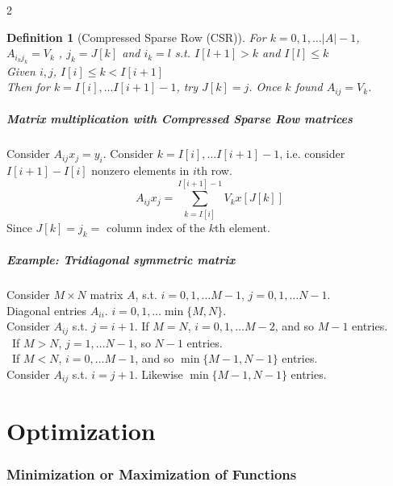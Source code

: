 \documentclass[10pt]{amsart}
\newtheorem{definition}{Definition}
\begin{document}
\begin{multicols*}{2}
\begin{definition}[Compressed Sparse Row (CSR)]
	For $k=0,1, \dots |A|-1$, \\
	$A_{i_k j_k} = V_k$ , $j_k = J[k]$ and $i_k = l$ s.t. $I [ l + 1] > k$ and $I[l] \leq k$ \\
	
	Given $i,j$, $I[i] \leq k < I[i+1]$ \\
	Then for $k = I[i], \dots I[i+1] - 1$, try $J[k] = j$. Once $k$ found $A_{ij} = V_k$.
\end{definition}

\subsubsection{Matrix multiplication with Compressed Sparse Row matrices}

Consider $A_{ij} x_j = y_i$. Consider $k=I[i] , \dots I[i+1] -1$, i.e. consider $I[i+1] - I[i]$ nonzero elements in $i$th row. \\

\[
A_{ij} x_j = \sum_{k= I[i]}^{I[i + 1] - 1} V_k x[J[k]]
\]
Since $J[k] = j_k = $ column index of the $k$th element.

\subsubsection{Example: Tridiagonal symmetric matrix}

Consider $M \times N$ matrix $A$, s.t. $ i = 0,1, \dots M-1$, $j = 0,1, \dots N-1$. \\

Diagonal entries $A_{ii}$. $i=0, 1, \dots \min{ \lbrace M, N \rbrace}$. \\

Consider $A_{ij}$ s.t. $j=i+1$. If $M=N$, $i=0,1,\dots M-2$, and so $M-1$ entries. \\

\quad \, If $M > N$, $j=1, \dots N-1$, so $N-1$ entries. \\
\quad \, If $M < N$, $i=0, \dots M-1$, and so $\min{ \lbrace M -1, N-1 \rbrace}$ entries. \\

Consider $A_{ij}$ s.t. $i=j + 1$. Likewise $\min{ \lbrace M- 1, N-1 \rbrace}$ entries. \\

\part{Optimization}

\section{Minimization or Maximization of Functions}


\end{multicols*}
\end{document}

